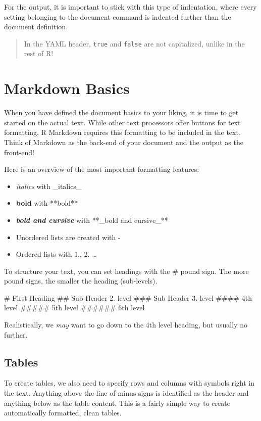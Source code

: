 \documentclass[
]{book}
\providecommand{\tightlist}{%
  \setlength{\itemsep}{0pt}\setlength{\parskip}{0pt}}
\begin{document}
For the output, it is important to stick with this type of indentation, where every setting belonging to the document command is indented further than the document definition.

\begin{quote}
In the YAML header, \texttt{true} and \texttt{false} are not capitalized, unlike in the rest of R!
\end{quote}

\section{Markdown Basics}\label{markdown-basics}

When you have defined the document basics to your liking, it is time to get started on the actual text.
While other text processors offer buttons for text formatting, R Markdown requires this formatting to be included in the text.
Think of Markdown as the back-end of your document and the output as the front-end!

Here is an overview of the most important formatting features:

\begin{itemize}
\tightlist
\item
  \emph{italics} with \_italics\_
\item
  \textbf{bold} with **bold**
\item
  \textbf{\emph{bold and cursive}} with **\_bold and cursive\_**
\item
  Unordered lists are created with -
\item
  Ordered lists with 1., 2. \ldots{}
\end{itemize}

To structure your text, you can set headings with the \# pound sign.
The more pound signs, the smaller the heading (sub-levels).

\# First Heading
\#\# Sub Header 2. level
\#\#\# Sub Header 3. level
\#\#\#\# 4th level
\#\#\#\#\# 5th level
\#\#\#\#\#\# 6th level

Realistically, we \emph{may} want to go down to the 4th level heading, but usually no further.

\subsection*{Tables}\label{tables}

To create tables, we also need to specify rows and columns with symbols right in the text.
Anything above the line of minus signs is identified as the header and anything below as the table content.
This is a fairly simple way to create automatically formatted, clean tables.
\end{document}
